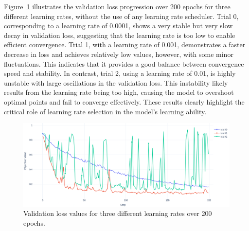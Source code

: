 Figure~\ref{fig:loss-None} illustrates the validation loss progression over 200 epochs for three different learning rates, without the use of any learning rate scheduler. Trial 0, corresponding to a learning rate of 0.0001, shows a very stable but very slow decay in validation loss, suggesting that the learning rate is too low to enable efficient convergence. Trial 1, with a learning rate of 0.001, demonstrates a faster decrease in loss and achieves relatively low values, however, with some minor fluctuations. This indicates that it provides a good balance between convergence speed and stability. In contrast, trial 2, using a learning rate of 0.01, is highly unstable with large oscillations in the validation loss. This instability likely results from the learning rate being too high, causing the model to overshoot optimal points and fail to converge effectively. These results clearly highlight the critical role of learning rate selection in the model’s learning ability.

\begin{figure} [H]
    \centering 
    \includegraphics[width=1\linewidth]{PICTURES/loss_None.png} 
    \caption{Validation loss values for three different learning rates over 200 epochs.} \label{fig:loss-None} 
\end{figure}

